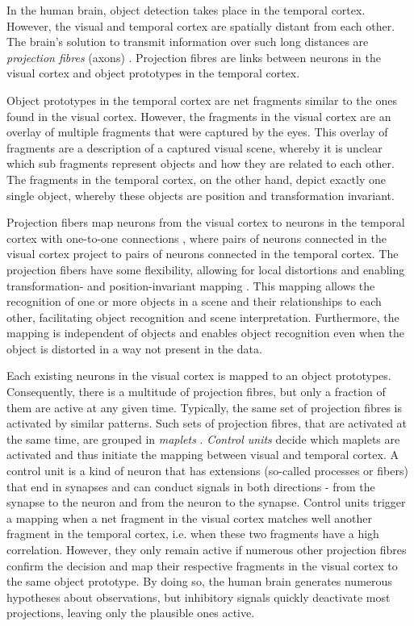 In the human brain, object detection takes place in the temporal cortex.
However, the visual and temporal cortex are spatially distant from each other.
The brain's solution to transmit information over such long distances are \emph{projection fibres} (axons) .
Projection fibres are links between neurons in the visual cortex and object prototypes in the temporal cortex.

Object prototypes in the temporal cortex are net fragments similar to the ones found in the visual cortex. However, the fragments in the visual cortex are an overlay of multiple fragments that were captured by the eyes.
This overlay of fragments are a description of a captured visual scene, whereby it is unclear which sub fragments represent objects and how they are related to each other.
The fragments in the temporal cortex, on the other hand, depict exactly one single object, whereby these objects are position and transformation invariant.

Projection fibers map neurons from the visual cortex to neurons in the temporal cortex with one-to-one connections , where pairs of neurons connected in the visual cortex project to pairs of neurons connected in the temporal cortex. The projection fibers have some flexibility, allowing for local distortions and enabling transformation- and position-invariant mapping . This mapping allows the recognition of one or more objects in a scene and their relationships to each other, facilitating object recognition and scene interpretation. Furthermore, the mapping is independent of objects and enables object recognition even when the object is distorted in a way not present in the data.

Each existing neurons in the visual cortex is mapped to an object prototypes. Consequently, there is a multitude of projection fibres, but only a fraction of them are active at any given time.
Typically, the same set of projection fibres is activated by similar patterns.
Such sets of projection fibres, that are activated at the same time, are grouped in \emph{maplets} .
\emph{Control units} decide which maplets are activated and thus initiate the mapping between visual and temporal cortex. 
A control unit is a kind of neuron that has extensions (so-called processes or fibers) that end in synapses and can conduct signals in both directions - from the synapse to the neuron and from the neuron to the synapse.
Control units trigger a mapping when a net fragment in the visual cortex matches well another fragment in the temporal cortex, i.e. when these two fragments have a high correlation. However, they only remain active if numerous other projection fibres confirm the decision and map their respective fragments in the visual cortex to the same object prototype. By doing so, the human brain generates numerous hypotheses about observations, but inhibitory signals quickly deactivate most projections, leaving only the plausible ones active.

